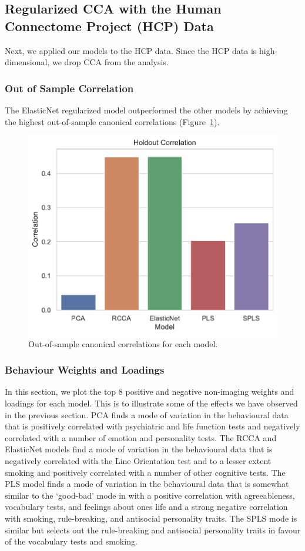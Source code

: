 \subsection{Regularized CCA with the Human Connectome Project (HCP) Data}

Next, we applied our models to the HCP data. Since the HCP data is high-dimensional, we drop CCA from the analysis.

\subsubsection{Out of Sample Correlation}

The ElasticNet regularized model outperformed the other models by achieving the highest out-of-sample canonical correlations (Figure~\ref{fig:performance}).

\begin{figure}
\centering
\includegraphics[width=0.5\linewidth]{figures/regularization/hcp/holdout_correlations.pdf}
\caption{Out-of-sample canonical correlations for each model.}\label{fig:performance}
\end{figure}

\subsubsection{Behaviour Weights and Loadings}

In this section, we plot the top 8 positive and negative non-imaging weights and loadings for each model.
This is to illustrate some of the effects we have observed in the previous section.
PCA finds a mode of variation in the behavioural data that is positively correlated with psychiatric and life function tests and negatively correlated with a number of emotion and personality tests.
The RCCA and ElasticNet models find a mode of variation in the behavioural data that is negatively correlated with the Line Orientation test and to a lesser extent smoking and positively correlated with a number of other cognitive tests.
The PLS model finds a mode of variation in the behavioural data that is somewhat similar to the `good-bad' mode in \cite{smith2015positive} with a positive correlation with agreeableness, vocabulary tests, and feelings about ones life and a strong negative correlation with smoking, rule-breaking, and antisocial personality traits.
The SPLS mode is similar but selects out the rule-breaking and antisocial personality traits in favour of the vocabulary tests and smoking.

